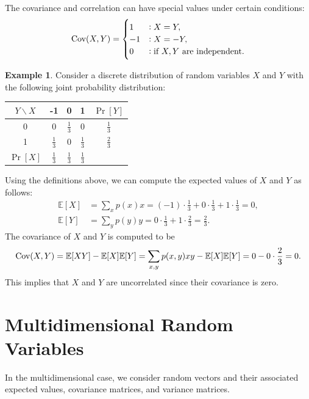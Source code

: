 \documentclass[12pt,openany]{book}
\theoremstyle{definition}
\newtheorem{example}{Example}[chapter]
\newcommand{\E}{\mathbb{E}}
\newcommand{\Cov}{\textnormal{Cov}}
\begin{document}
	The covariance and correlation can have special values under certain conditions:
	\[
	\Cov(X, Y) = 
	\begin{cases}
		1 & : X = Y,\\
		-1 & : X = -Y,\\
		0 & : \text{if \( X, Y \) are independent}.
	\end{cases}
	\]
	
	\begin{example}
		Consider a discrete distribution of random variables \( X \) and \( Y \) with the following joint probability distribution:
		
		\begin{center}
			\begin{tabular}{c|ccc|c}
				\( Y \backslash X \) & -1 & 0 & 1 & \( \Pr[Y] \) \\
				\hline
				0 & 0 & \( \frac{1}{3} \) & 0 & \( \frac{1}{3} \) \\
				1 & \( \frac{1}{3} \) & 0 & \( \frac{1}{3} \) & \( \frac{2}{3} \) \\
				\hline
				\( \Pr[X] \) & \( \frac{1}{3} \) & \( \frac{1}{3} \) & \( \frac{1}{3} \) & \\
			\end{tabular}
		\end{center}
		
		Using the definitions above, we can compute the expected values of \( X \) and \( Y \) as follows:
		\[
		\begin{aligned}
			\E[X] &= \sum_x p(x)x = (-1) \cdot \frac{1}{3} + 0 \cdot \frac{1}{3} + 1 \cdot \frac{1}{3} = 0, \\
			\E[Y] &= \sum_y p(y)y = 0 \cdot \frac{1}{3} + 1 \cdot \frac{2}{3} = \frac{2}{3}.
		\end{aligned}
		\]
		The covariance of \( X \) and \( Y \) is computed to be
		\[
		\Cov(X, Y) = \E[XY] - \E[X]\E[Y] = \sum_{x,y} p(x, y)xy - \E[X]\E[Y] = 0 - 0 \cdot \frac{2}{3} = 0.
		\]
		This implies that \( X \) and \( Y \) are uncorrelated since their covariance is zero.
	\end{example}
	
	\section{Multidimensional Random Variables}
	
	In the multidimensional case, we consider random vectors and their associated expected values, covariance matrices, and variance matrices.
	
\end{document}
